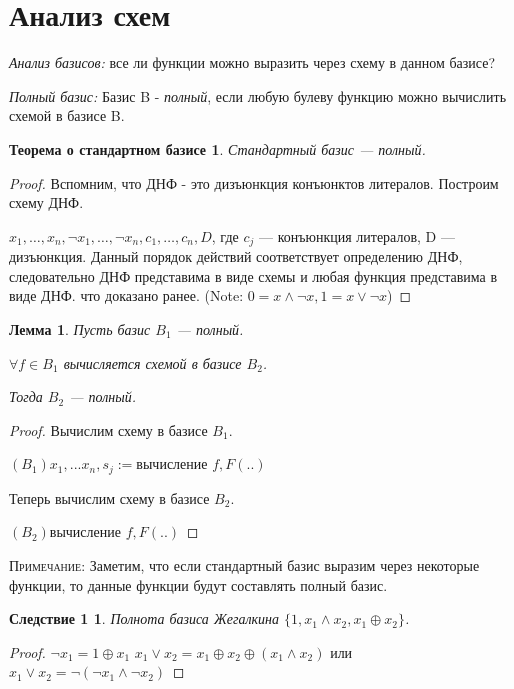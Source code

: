 ﻿\documentclass[a4paper, 12pt]{article}
\newtheorem*{standartbase}{Теорема о стандартном базисе}
\newtheorem*{fulllemma}{Лемма}
\newtheorem*{sl1}{Следствие 1}
\begin{document}
 \section*{Анализ схем}
 
 \textit{Анализ базисов: } все ли функции можно выразить через схему в данном базисе?
 
 \textit{Полный базис: } Базис B - \textit{полный}, если любую булеву функцию можно вычислить схемой в базисе B.
 
 \begin{standartbase}
 Стандартный базис --- полный.
 \end{standartbase}
 \begin{proof}
Вспомним, что ДНФ - это дизъюнкция конъюнктов литералов. Построим схему ДНФ.

$x_1, \ldots ,x_n, \lnot x_1, \ldots ,\lnot x_n, c_1, \ldots ,c_n, D$, где $c_j$ --- конъюнкция литералов, D --- дизъюнкция. Данный порядок действий соответствует определению ДНФ, следовательно ДНФ представима в виде схемы и любая функция представима в виде ДНФ. что доказано ранее. (Note: $0 = x \wedge \lnot x, 1 = x \vee \lnot x$)
\end{proof}

 \begin{fulllemma}
Пусть базис $B_1$ --- полный.

$\forall f \in B_1$ вычисляется схемой в базисе $B_2$.

Тогда $B_2$ --- полный.
 \end{fulllemma}
 \begin{proof}
 Вычислим схему в базисе $B_1$.
 
$(B_1) x_1,... x_n,s_j := $вычисление $f, F(..)$

Теперь вычислим схему в базисе $B_2$.

$(B_2) 			   $вычисление $f, F(..)$

\end{proof}
\textsc{Примечание: } Заметим, что если стандартный базис выразим через некоторые функции, то данные функции будут составлять полный базис.

\begin{sl1}
Полнота базиса Жегалкина $\{1, x_1 \wedge x_2, x_1 \oplus x_2\}$.
\end{sl1}
\begin{proof}
$\lnot x_1 = 1 \oplus x_1$ $x_1 \vee x_2 = x_1 \oplus x_2 \oplus (x_1 \wedge x_2)$ или $x_1 \vee x_2 = \lnot (\lnot x_1 \wedge \lnot x_2)$
\end{proof}
\end{document}
